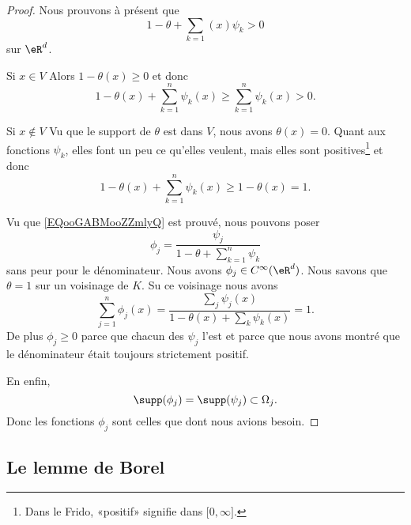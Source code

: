 \begin{proof}
    Nous prouvons à présent que
    \begin{equation}        \label{EQooGABMooZZmlyQ}
        1-\theta+\sum_{k=1}(x)\psi_k>0
    \end{equation}
    sur \( \eR^d\).
    \begin{subproof}
    \item[Si $x\in V$]
        Alors \( 1-\theta(x)\geq 0\) et donc
        \begin{equation}
            1-\theta(x)+\sum_{k=1}^n\psi_k(x)\geq \sum_{k=1}^n\psi_k(x)>0.
        \end{equation}
    \item[Si $x\notin V$]
        Vu que le support de \( \theta\) est dans \( V\), nous avons \( \theta(x)=0\). Quant aux fonctions \( \psi_k\), elles font un peu ce qu'elles veulent, mais elles sont positives\footnote{Dans le Frido, «positif» signifie dans $\mathopen[ 0 , \infty \mathclose]$.} et donc
        \begin{equation}
            1-\theta(x)+\sum_{k=1}^n\psi_k(x)\geq 1-\theta(x)=1.
        \end{equation}
    \end{subproof}
    Vu que \eqref{EQooGABMooZZmlyQ} est prouvé, nous pouvons poser
    \begin{equation}
        \phi_j=\frac{ \psi_j }{ 1-\theta+\sum_{k=1}^n\psi_k }
    \end{equation}
    sans peur pour le dénominateur. Nous avons \( \phi_j\in  C^{\infty}(\eR^d)\). Nous savons que \( \theta=1\) sur un voisinage de \( K\). Su ce voisinage nous avons
    \begin{equation}
        \sum_{j=1}^n\phi_j(x)=\frac{ \sum_{j}\psi_j(x) }{ 1-\theta(x)+\sum_k\psi_k(x) }=1.
    \end{equation}
    De plus \( \phi_j\geq 0\) parce que chacun des \( \psi_j\) l'est et parce que nous avons montré que le dénominateur était toujours strictement positif.

    En enfin,
    \begin{equation}
        \supp(\phi_j)=\supp(\psi_j)\subset\Omega_j.
    \end{equation}
    Donc les fonctions \( \phi_j\) sont celles que dont nous avions besoin.
\end{proof}

\subsection{Le lemme de Borel}

